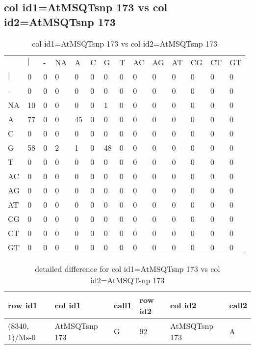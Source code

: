 \subsection{col id1=AtMSQTsnp 173 vs col id2=AtMSQTsnp 173}
\begin{center}
\begin{longtable}{|l|l|l|l|l|l|l|l|l|l|l|l|l|l|}
\caption{col id1=AtMSQTsnp 173 vs col id2=AtMSQTsnp 173} \label{table_dm544}\\
\hline
\\
\hline
&$|$&-&NA&A&C&G&T&AC&AG&AT&CG&CT&GT\\
$|$&0&0&0&0&0&0&0&0&0&0&0&0&0\\
-&0&0&0&0&0&0&0&0&0&0&0&0&0\\
NA&10&0&0&0&0&1&0&0&0&0&0&0&0\\
A&77&0&0&45&0&0&0&0&0&0&0&0&0\\
C&0&0&0&0&0&0&0&0&0&0&0&0&0\\
G&58&0&2&1&0&48&0&0&0&0&0&0&0\\
T&0&0&0&0&0&0&0&0&0&0&0&0&0\\
AC&0&0&0&0&0&0&0&0&0&0&0&0&0\\
AG&0&0&0&0&0&0&0&0&0&0&0&0&0\\
AT&0&0&0&0&0&0&0&0&0&0&0&0&0\\
CG&0&0&0&0&0&0&0&0&0&0&0&0&0\\
CT&0&0&0&0&0&0&0&0&0&0&0&0&0\\
GT&0&0&0&0&0&0&0&0&0&0&0&0&0\\
\hline
\end{longtable}
\end{center}

\begin{center}
\begin{longtable}{|l|l|l|l|l|l|}
\caption{detailed difference for col id1=AtMSQTsnp 173 vs col id2=AtMSQTsnp 173} \label{table_dm545}\\
\hline
row id1&col id1&call1&row id2&col id2&call2\\
\hline
(8340, 1)/Ms-0&AtMSQTsnp 173&G&92&AtMSQTsnp 173&A\\
\hline
\end{longtable}
\end{center}

